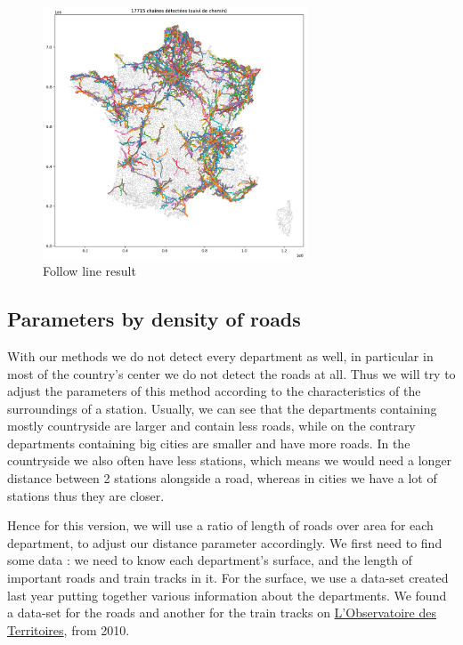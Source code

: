 \documentclass[main.tex]{subfiles}
\begin{document}
\begin{figure}[H]
    \centering
    \includegraphics[width=0.7\textwidth]{Images/Res_Followline.png}
    \caption{Follow line result}
\end{figure}


\subsection{Parameters by density of roads}

With our methods we do not detect every department as well, in particular in most of the country's center we do not detect the roads at all. Thus we will try to adjust the parameters of this method according to the characteristics of the surroundings of a station. Usually, we can see that the departments containing mostly countryside are larger and contain less roads, while on the contrary departments containing big cities are smaller and have more roads. In the countryside we also often have less stations, which means we would need a longer distance between 2 stations alongside a road, whereas in cities we have a lot of stations thus they are closer. 

Hence for this version, we will use a ratio of length of roads over area for each department, to adjust our distance parameter accordingly. We first need to find some data : we need to know each department's surface, and the length of important roads and train tracks in it. For the surface, we use a data-set created last year putting together various information about the departments. We found a data-set for the roads and another for the train tracks on \href{https://www.observatoire-des-territoires.gouv.fr}{L'Observatoire des Territoires}, from 2010. 
\end{document}
